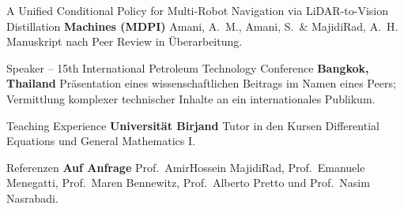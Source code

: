 \documentclass[
  a4paper, 
   maincolor=cvblue,
   sectioncolor=cvblue,
]{fortysecondscv}
\begin{document}
\begin{cvtable}
	{\color{cvsectioncolor}A Unified Conditional Policy for Multi-Robot Navigation via LiDAR-to-Vision Distillation}
	{\textbf{Machines (MDPI)}}
	{Amani, A.\ M., Amani, S.\ \& MajidiRad, A.\ H. Manuskript nach Peer Review in Überarbeitung.}
\end{cvtable}

\begin{cvtable}
	{\color{cvsectioncolor}Speaker -- 15th International Petroleum Technology Conference}
	{\textbf{Bangkok, Thailand}}
	{Präsentation eines wissenschaftlichen Beitrags im Namen eines Peers; Vermittlung komplexer technischer Inhalte an ein internationales Publikum.}

	\cvitem{}
	{\color{cvsectioncolor}Teaching Experience}
	{\textbf{Universität Birjand}}
	{Tutor in den Kursen Differential Equations und General Mathematics I.}

	\cvitem{}
	{\color{cvsectioncolor}Referenzen}
	{\textbf{Auf Anfrage}}
	{Prof.\ AmirHossein MajidiRad, Prof.\ Emanuele Menegatti, Prof.\ Maren Bennewitz, Prof.\ Alberto Pretto und Prof.\ Nasim Nasrabadi.}
\end{cvtable}
\end{document}

